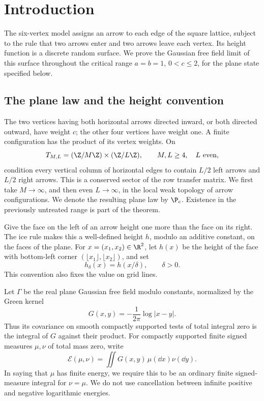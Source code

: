 \section{Introduction}\label{sec:introduction}

The six-vertex model assigns an arrow to each edge of the square lattice,
subject to the rule that two arrows enter and two arrows leave each vertex.
Its height function is a discrete random surface. We prove the Gaussian
free field limit of this surface throughout the critical range
\(a=b=1\), \(0<c\le2\), for the plane state specified below.

\subsection{The plane law and the height convention}

The two vertices having both horizontal arrows directed inward, or both
directed outward, have weight \(c\); the other four vertices have weight
one. A finite configuration has the product of its vertex weights.
On
\[
 T_{M,L}=(\Z/M\Z)\times(\Z/L\Z),\qquad M,L\ge4,\quad L\ \text{even},
\]
condition every vertical column of horizontal edges to contain \(L/2\)
left arrows and \(L/2\) right arrows. This is a conserved sector of the row
transfer matrix. We first take \(M\to\infty\), and then even \(L\to\infty\),
in the local weak topology of arrow configurations. We denote the resulting
plane law by \(\P_c\). Existence in the previously untreated range is part
of the theorem.

Give the face on the left of an arrow height one more than the face on its
right. The ice rule makes this a well-defined height \(h\), modulo an
additive constant, on the faces of the plane. For \(x=(x_1,x_2)\in\R^2\),
let \(h(x)\) be the height of the face with bottom-left corner
\((\lfloor x_1\rfloor,\lfloor x_2\rfloor)\), and set
\[
 h_\delta(x)=h(x/\delta),\qquad \delta>0.
\]
This convention also fixes the value on grid lines.

Let \(\Gamma\) be the real plane Gaussian free field modulo constants,
normalized by the Green kernel
\begin{equation}\label{eq:green}
 G(x,y)=-\frac1{2\pi}\log|x-y|.
\end{equation}
Thus its covariance on smooth compactly supported tests of total integral
zero is the integral of \(G\) against their product.
For compactly supported finite signed measures \(\mu,\nu\) of total mass
zero, write
\[
 \mathcal E(\mu,\nu)=\iint G(x,y)\,\mu(\dd x)\nu(\dd y).
\]
In saying that \(\mu\) has finite energy, we require this to be an ordinary
finite signed-measure integral for \(\nu=\mu\). We do not use cancellation
between infinite positive and negative logarithmic energies.

